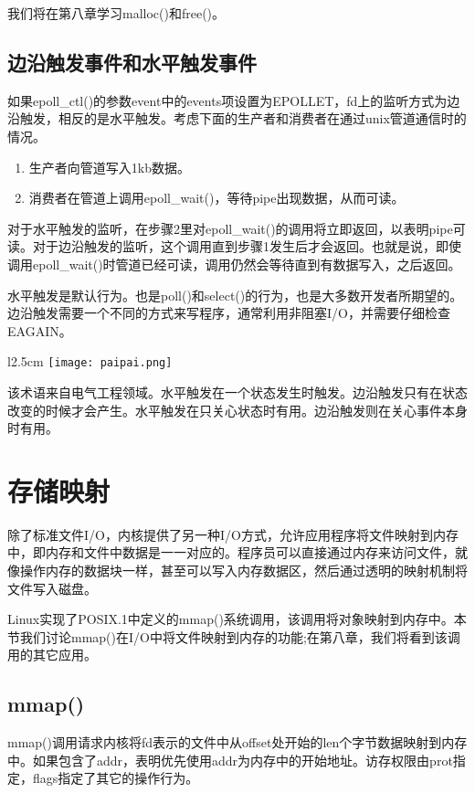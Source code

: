 我们将在第八章学习malloc()和free()。

\subsection{边沿触发事件和水平触发事件}

如果epoll\_ctl()的参数event中的events项设置为EPOLLET，fd上的监听方式为边沿触发，相反的是水平触发。考虑下面的生产者和消费者在通过unix管道通信时的情况。

\begin{enumerate}
\item 生产者向管道写入1kb数据。
\item 消费者在管道上调用epoll\_wait()，等待pipe出现数据，从而可读。
\end{enumerate}

对于水平触发的监听，在步骤2里对epoll\_wait()的调用将立即返回，以表明pipe可读。对于边沿触发的监听，这个调用直到步骤1发生后才会返回。也就是说，即使调用epoll\_wait()时管道已经可读，调用仍然会等待直到有数据写入，之后返回。

水平触发是默认行为。也是poll()和select()的行为，也是大多数开发者所期望的。边沿触发需要一个不同的方式来写程序，通常利用非阻塞I/O，并需要仔细检查EAGAIN。

\begin{wrapfigure}{l}{2.5cm}
  \texttt{[image: paipai.png]}
\end{wrapfigure}
\mbox{}该术语来自电气工程领域。水平触发在一个状态发生时触发。边沿触发只有在状态改变的时候才会产生。水平触发在只关心状态时有用。边沿触发则在关心事件本身时有用。
 
\section{存储映射}

除了标准文件I/O，内核提供了另一种I/O方式，允许应用程序将文件映射到内存中，即内存和文件中数据是一一对应的。程序员可以直接通过内存来访问文件，就像操作内存的数据块一样，甚至可以写入内存数据区，然后通过透明的映射机制将文件写入磁盘。

Linux实现了POSIX.1中定义的mmap()系统调用，该调用将对象映射到内存中。本节我们讨论mmap()在I/O中将文件映射到内存的功能;在第八章，我们将看到该调用的其它应用。

\subsection{mmap()}

mmap()调用请求内核将fd表示的文件中从offset处开始的len个字节数据映射到内存中。如果包含了addr，表明优先使用addr为内存中的开始地址。访存权限由prot指定，flags指定了其它的操作行为。

